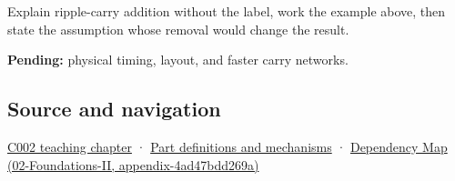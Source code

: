 Explain ripple-carry addition without the label, work the example above, then state the assumption whose removal would change the result.

\textbf{Pending:} physical timing, layout, and faster carry networks.

\subsection{Source and navigation}\label{appendix-17917d9fdbe3-source-and-navigation}

\hyperref[01-foundations-i-ch001-arithmetic-becomes-a-policy]{C002 teaching chapter} · \hyperref[appendix-fd090d982a15]{Part definitions and mechanisms} · \href{../02-Foundations-II/main.pdf\#nameddest=appendix-4ad47bdd269a}{Dependency Map (02-Foundations-II, appendix-4ad47bdd269a)}
